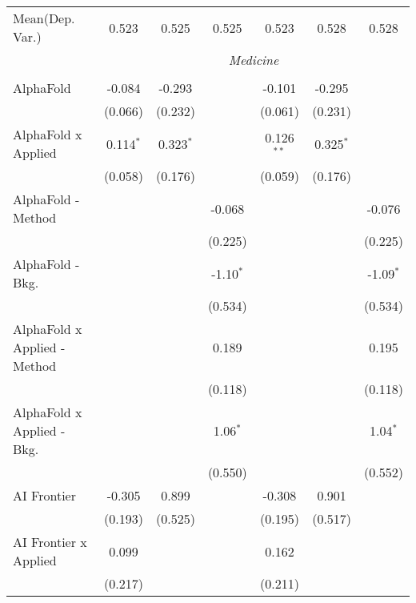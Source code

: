 \begin{tabular}{lcccccc}
Mean(Dep. Var.) & 0.523 & 0.525 & 0.525 & 0.523 & 0.528 & 0.528 \\
 & \multicolumn{6}{c}{\textit{Medicine}} \\ \\
   AlphaFold                    & -0.084      & -0.293      &             & -0.101       & -0.295      &   \\   
                                & (0.066)     & (0.232)     &             & (0.061)      & (0.231)     &   \\   
   AlphaFold x Applied          & 0.114$^{*}$ & 0.323$^{*}$ &             & 0.126$^{**}$ & 0.325$^{*}$ &   \\   
                                & (0.058)     & (0.176)     &             & (0.059)      & (0.176)     &   \\   
   AlphaFold - Method           &             &             & -0.068      &              &             & -0.076\\   
                                &             &             & (0.225)     &              &             & (0.225)\\   
   AlphaFold - Bkg.             &             &             & -1.10$^{*}$ &              &             & -1.09$^{*}$\\   
                                &             &             & (0.534)     &              &             & (0.534)\\   
   AlphaFold x Applied - Method &             &             & 0.189       &              &             & 0.195\\   
                                &             &             & (0.118)     &              &             & (0.118)\\   
   AlphaFold x Applied - Bkg.   &             &             & 1.06$^{*}$  &              &             & 1.04$^{*}$\\   
                                &             &             & (0.550)     &              &             & (0.552)\\   
   AI Frontier                  & -0.305      & 0.899       &             & -0.308       & 0.901       &   \\   
                                & (0.193)     & (0.525)     &             & (0.195)      & (0.517)     &   \\   
   AI Frontier x Applied        & 0.099       &             &             & 0.162        &             &   \\   
                                & (0.217)     &             &             & (0.211)      &             &   \\   

\end{tabular}
